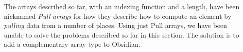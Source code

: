   
The arrays described so far, with an indexing function and a length, have 
been nicknamed {\em Pull arrays} for how they describe how to 
compute an element by {\em pulling} data from a number 
of places. Using just Pull arrays, we have been unable to solve the 
problems described so far in this section. The solution is to add a complementary array type to Obsidian. 









